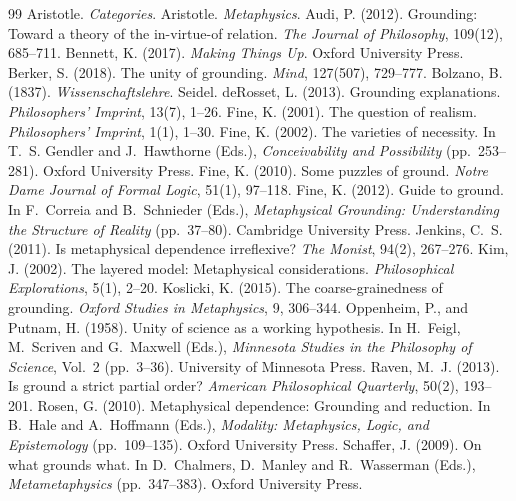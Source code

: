 \documentclass{situationist-preprint}
\begin{document}
\begin{thebibliography}{99}\small
{} Aristotle. \emph{Categories}.
 Aristotle. \emph{Metaphysics}.
 Audi, P. (2012). Grounding: Toward a theory of the in-virtue-of relation. \emph{The Journal of Philosophy}, 109(12), 685--711.
 Bennett, K. (2017). \emph{Making Things Up}. Oxford University Press.
 Berker, S. (2018). The unity of grounding. \emph{Mind}, 127(507), 729--777.
 Bolzano, B. (1837). \emph{Wissenschaftslehre}. Seidel.
 deRosset, L. (2013). Grounding explanations. \emph{Philosophers' Imprint}, 13(7), 1--26.
 Fine, K. (2001). The question of realism. \emph{Philosophers' Imprint}, 1(1), 1--30.
 Fine, K. (2002). The varieties of necessity. In T.~S. Gendler and J.~Hawthorne (Eds.), \emph{Conceivability and Possibility} (pp.~253--281). Oxford University Press.
 Fine, K. (2010). Some puzzles of ground. \emph{Notre Dame Journal of Formal Logic}, 51(1), 97--118.
 Fine, K. (2012). Guide to ground. In F.~Correia and B.~Schnieder (Eds.), \emph{Metaphysical Grounding: Understanding the Structure of Reality} (pp.~37--80). Cambridge University Press.
 Jenkins, C.~S. (2011). Is metaphysical dependence irreflexive? \emph{The Monist}, 94(2), 267--276.
 Kim, J. (2002). The layered model: Metaphysical considerations. \emph{Philosophical Explorations}, 5(1), 2--20.
 Koslicki, K. (2015). The coarse-grainedness of grounding. \emph{Oxford Studies in Metaphysics}, 9, 306--344.
 Oppenheim, P., and Putnam, H. (1958). Unity of science as a working hypothesis. In H.~Feigl, M.~Scriven and G.~Maxwell (Eds.), \emph{Minnesota Studies in the Philosophy of Science}, Vol.~2 (pp.~3--36). University of Minnesota Press.
 Raven, M.~J. (2013). Is ground a strict partial order? \emph{American Philosophical Quarterly}, 50(2), 193--201.
 Rosen, G. (2010). Metaphysical dependence: Grounding and reduction. In B.~Hale and A.~Hoffmann (Eds.), \emph{Modality: Metaphysics, Logic, and Epistemology} (pp.~109--135). Oxford University Press.
 Schaffer, J. (2009). On what grounds what. In D.~Chalmers, D.~Manley and R.~Wasserman (Eds.), \emph{Metametaphysics} (pp.~347--383). Oxford University Press.

\end{thebibliography}
\end{document}
